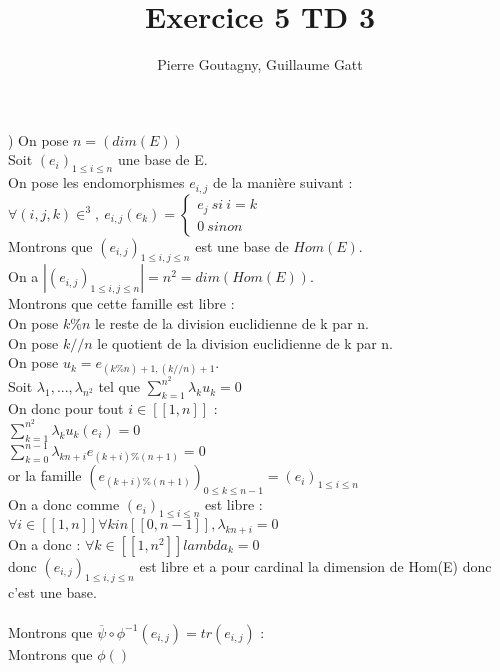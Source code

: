 \documentclass{article}
\begin{document}
\title{Exercice 5 TD 3}
\author{Pierre Goutagny, Guillaume Gatt}
) On pose $n=(dim(E))$ \\
Soit $(e_i)_{ 1\leq i \leq n}$ une base de E. \\
On pose les endomorphismes $e_{i,j}$ de la manière suivant : \\
$\forall (i,j,k) \in ^3,\ e_{i,j}(e_k)=\begin{cases}
e_j \ si \ i=k \\
0 \ sinon
\end{cases}$ \\
Montrons que $(e_{i,j})_{ 1\leq i,j \leq n}$ est une base de $Hom(E)$. \\
On a $|(e_{i,j})_{ 1\leq i,j \leq n}|=n^2=dim(Hom(E))$. \\
Montrons que cette famille est libre : \\
On pose $k\%n$ le reste de la division euclidienne de k par n. \\
On pose $k//n$ le quotient de la division euclidienne de k par n. \\
On pose $u_k=e_{(k\%n)+1,(k//n)+1}$. \\
Soit $\lambda_1,...,\lambda_{n^2}$ tel que $\sum_{k=1}^{n^2} \lambda_k u_k =0$ \\
On donc pour tout $i \in [[1,n]]$ : \\
$\sum_{k=1}^{n^2} \lambda_k u_k(e_i) =0$ \\
$\sum_{k=0}^{n-1} \lambda_{kn+i} e_{(k+i)\% (n+1)} =0$ \\
or la famille $(e_{(k+i)\% (n+1)})_{ 0\leq k\leq n-1}=(e_i)_{ 1\leq i\leq n}$ \\
On a donc comme $(e_i)_{ 1\leq i \leq n}$ est libre : \\
$\forall i \in [[1,n]] \forall k in [[0,n-1]], \lambda_{kn+i}=0$ \\
On a donc :  $\forall k \in [[1,n^2]] lambda_k=0$ \\
donc $(e_{i,j})_{ 1\leq i,j \leq n}$ est libre et a pour cardinal la dimension de Hom(E) donc c'est une base. \\ \\
Montrons que $\overline{\psi} \circ \phi^{-1}(e_{i,j})=tr(e_{i,j})$ : \\
Montrons que $\phi()$
\end{document}
